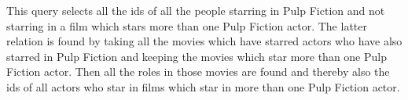 This query selects all the ids of all the people starring in Pulp Fiction and not starring in a film which stars more than one Pulp Fiction actor. The latter relation is found by taking all the movies which have starred actors who have also starred in Pulp Fiction and keeping the movies which star more than one Pulp Fiction actor. Then all the roles in those movies are found and thereby also the ids of all actors who star in films which star in more than one Pulp Fiction actor.